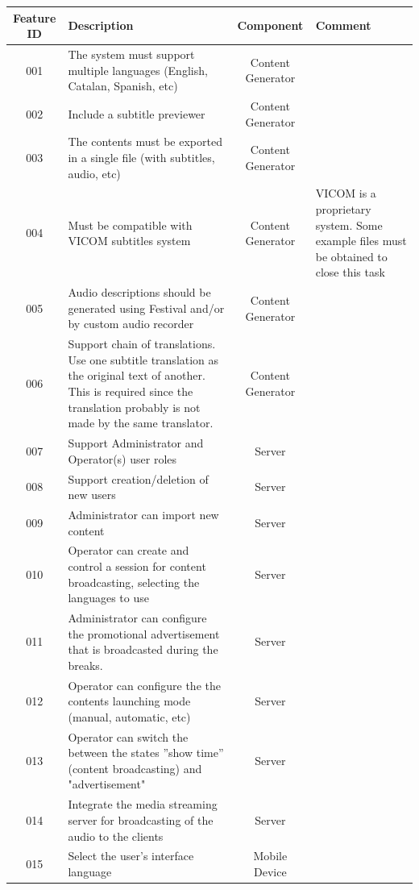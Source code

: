 \documentclass[10pt, oneside, a4paper]{article}
\begin{document}
\begin{center}
	
	\begin{longtable}{ | c | p{6cm} | c | p{5cm} |}
	\hline
	Feature ID & Description & Component & Comment \\ \hline
	\hline
	\hline
	001 & The system must support multiple languages (English, Catalan, Spanish, etc) & Content Generator & \\ \hline
	002 & Include a subtitle previewer & Content Generator & \\ \hline
	003 & The contents must be exported in a single file (with subtitles, audio, etc) & Content Generator & \\ \hline
	004 & Must be compatible with VICOM subtitles system & Content Generator & VICOM is a proprietary system. Some example files must be obtained to close this task\\ \hline
	005 & Audio descriptions should be generated using Festival and/or by custom audio recorder  & Content Generator & \\ \hline
	006 & Support chain of translations. Use one subtitle translation as the original text of another. This is required since the translation probably is not made by the same translator.  & Content Generator & \\ \hline
	007 & Support Administrator and Operator(s) user roles & Server & \\ \hline
	008 & Support creation/deletion of new users & Server & \\ \hline
	009 & Administrator can import new content & Server & \\ \hline
	010 & Operator can create and control a session for content broadcasting, selecting the languages to use & Server & \\ \hline
	011 & Administrator can configure the promotional advertisement that is broadcasted during the breaks.  & Server & \\ \hline
	012 & Operator can configure the the contents launching mode (manual, automatic, etc) & Server & \\ \hline
	013 & Operator can switch the between the states ''show time'' (content broadcasting) and "advertisement" & Server & \\ \hline
	014 & Integrate the media streaming server for broadcasting of the audio to the clients & Server & \\ \hline
	015 & Select the user's interface language & Mobile Device & \\ \hline

\end{longtable}
\end{center}
\end{document}
